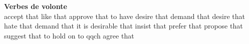 {\sffamily\bfseries Verbes de volonte}\\
   {accept that}
   {like that}
   {approve that}
   {to have desire that}
   {demand that}
   {desire that}
   {hate that}
   {demand that}
   {it is desirable that}
   {insist that}
   {prefer that}
   {propose that}
   {suggest that}
   {to hold on to qqch}
   {agree that}
